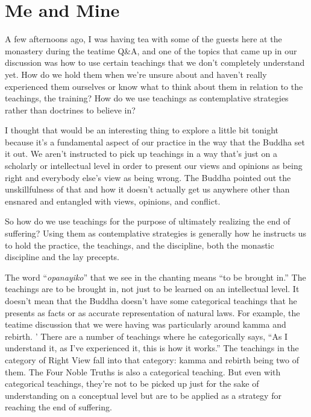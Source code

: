 
\chapter{Me and Mine}

A few afternoons ago, I was having tea with some of the guests here at the monastery during the teatime Q\&A, and one of the topics that came up in our discussion was how to use certain teachings that we don't completely understand yet. How do we hold them when we're unsure about and haven't really experienced them ourselves or know what to think about them in relation to the teachings, the training? How do we use teachings as contemplative strategies rather than doctrines to believe in?

I thought that would be an interesting thing to explore a little bit tonight because it's a fundamental aspect of our practice in the way that the Buddha set it out. We aren't instructed to pick up teachings in a way that's just on a scholarly or intellectual level in order to present our views and opinions as being right and everybody else's view as being wrong. The Buddha pointed out the unskillfulness of that and how it doesn't actually get us anywhere other than ensnared and entangled with views, opinions, and conflict.

So how do we use teachings for the purpose of ultimately realizing the end of suffering? Using them as contemplative strategies is generally how he instructs us to hold the practice, the teachings, and the discipline, both the monastic discipline and the lay precepts.

The word ``\emph{opanayiko}'' that we see in the chanting means ``to be brought in.'' The teachings are to be brought in, not just to be learned on an intellectual level. It doesn't mean that the Buddha doesn't have some categorical teachings that he presents as facts or as accurate representation of natural laws. For example, the teatime discussion that we were having was particularly around kamma and rebirth.
'
There are a number of teachings where he categorically says, ``As I understand it, as I've experienced it, this is how it works.'' The teachings in the category of Right View fall into that category: kamma and rebirth being two of them. The Four Noble Truths is also a categorical teaching. But even with categorical teachings, they're not to be picked up just for the sake of understanding on a conceptual level but are to be applied as a strategy for reaching the end of suffering.

